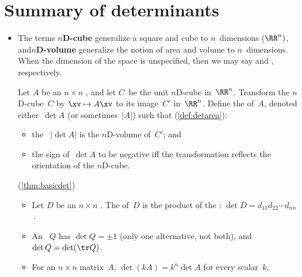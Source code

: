
\section{Summary of determinants}
\label{sec:sumd}


\begin{itemize}
\def\index#1{}%

\itemhi The `graphical formula'~\eqref{eq:dets23b} for \(2\times2\) and \(3\times3\) determinants are useful for both theory and many practical small problems.


\subsubsection*{Geometry underlies determinants}

\item The terms \index{nD-cube@$n$D-cube|textbf}\textbf{$n$D-cube}  generalize a square and cube to \(n\)~dimensions (\(\RR^n)\), and\index{nD-volume@$n$D-volume|textbf}\textbf{$n$D-volume} generalize the notion of area and volume to \(n\)~dimensions.
When the dimension of the space is unspecified, then we may say  and , respectively.

\itemhi Let \(A\) be an \(n\times n\) , and let \(C\)~be the unit \index{nD-cube@$n$D-cube}$n$D-cube in~\(\RR^n\).
Transform the \(n\)D-cube~\(C\) by \(\xv\mapsto A\xv\) to its image~\(C'\) in~\(\RR^n\). 
Define the  of~\(A\), denoted either~\(\det A\) (or sometimes~\(|A|\)) such that (\autoref{def:detarea}):  \begin{itemize}
\item the ~\(|\det A|\) is the \index{nD-volume@$n$D-volume}$n$D-volume of~\(C'\); and 
\item the sign of~\(\det A\) to be negative iff the transformation reflects the orientation of the $n$D-cube.
\end{itemize}

\itemhi (\autoref{thm:basicdet})
\begin{itemize}
\item   Let \(D\) be an \(n\times n\) .
The  of~\(D\) is the product of the : \(\det D=d_{11}d_{22}\cdots d_{nn}\)\,.
\item  An ~\(Q\) has  \(\det Q=\pm1\) (only one alternative, not both), and \(\det Q=\det(\tr Q)\).
\item   For an \(n\times n\) matrix~\(A\), \(\det(kA)=k^n\det A\) for every scalar~\(k\).
\end{itemize}


\end{itemize}
